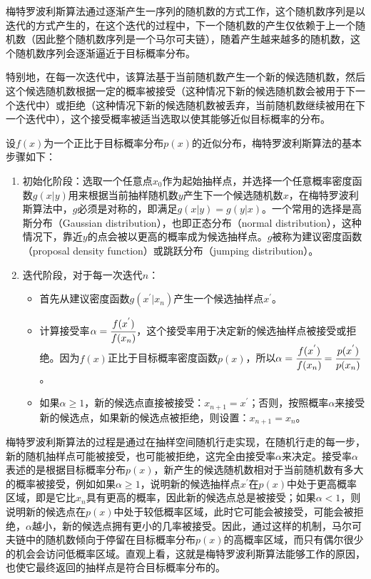 梅特罗波利斯算法通过逐渐产生一序列的随机数的方式工作，这个随机数序列是以迭代的方式产生的，在这个迭代的过程中，下一个随机数的产生仅依赖于上一个随机数（因此整个随机数序列是一个马尔可夫链），随着产生越来越多的随机数，这个随机数序列会逐渐逼近于目标概率分布。

特别地，在每一次迭代中，该算法基于当前随机数产生一个新的候选随机数，然后这个候选随机数根据一定的概率被接受（这种情况下新的候选随机数会被用于下一个迭代中）或拒绝（这种情况下新的候选随机数被丢弃，当前随机数继续被用在下一个迭代中），这个接受概率被适当选取以使其能够近似目标概率的分布。

设$f(x)$为一个正比于目标概率分布$p(x)$的近似分布，梅特罗波利斯算法的基本步骤如下：

\begin{enumerate}
	\item 初始化阶段：选取一个任意点$x_0$作为起始抽样点，并选择一个任意概率密度函数$g(x|y)$用来根据当前抽样随机数$y$产生下一个候选随机数$x$，在梅特罗波利斯算法中，$g$必须是对称的，即满足$g(x|y)=g(y|x)$。一个常用的选择是高斯分布（Gaussian distribution），也即正态分布（normal distribution），这种情况下，靠近$y$的点会被以更高的概率成为候选抽样点。$g$被称为建议密度函数（proposal density function）或跳跃分布（jumping distribution）。
	\item 迭代阶段，对于每一次迭代$n$：
	\begin{itemize}
		\item 首先从建议密度函数$g(x^{'}|x_n)$产生一个候选抽样点$x^{'}$。
		\item 计算接受率$\alpha= \cfrac{f(x^{'})}{f(x_n)}$，这个接受率用于决定新的候选抽样点被接受或拒绝。因为$f(x)$正比于目标概率密度函数$p(x)$，所以$\alpha= \cfrac{f(x^{'})}{f(x_n)}= \cfrac{p(x^{'})}{p(x_n)}$。
		\item 如果$\alpha\geq 1$，新的候选点直接被接受：$x_{n+1}=x^{'}$；否则，按照概率$\alpha$来接受新的候选点，如果新的候选点被拒绝，则设置：$x_{n+1}=x_n$。
	\end{itemize}
\end{enumerate}

梅特罗波利斯算法的过程是通过在抽样空间随机行走实现，在随机行走的每一步，新的随机抽样点可能被接受，也可能被拒绝，这完全由接受率$\alpha$来决定。接受率$\alpha$表述的是根据目标概率分布$p(x)$，新产生的候选随机数相对于当前随机数有多大的概率被接受，例如如果$\alpha\geq 1$，说明新的候选抽样点$x^{'}$在$p(x)$中处于更高概率区域，即是它比$x_n$具有更高的概率，因此新的候选点总是被接受；如果$\alpha<1$，则说明新的候选点在$p(x)$中处于较低概率区域，此时它可能会被接受，可能会被拒绝，$\alpha$越小，新的候选点拥有更小的几率被接受。因此，通过这样的机制，马尔可夫链中的随机数倾向于停留在目标概率分布$p(x)$的高概率区域，而只有偶尔很少的机会会访问低概率区域。直观上看，这就是梅特罗波利斯算法能够工作的原因，也使它最终返回的抽样点是符合目标概率分布的。





